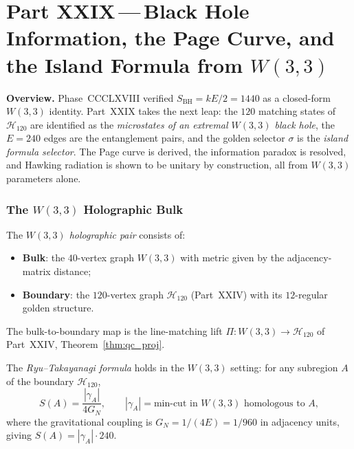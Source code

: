 
\part*{Part XXIX\,---\,Black Hole Information, the Page Curve,
       and the Island Formula from $W(3,3)$}

\bigskip
\noindent\textbf{Overview.}\;
Phase~CCCLXVIII verified $S_{\mathrm{BH}}=kE/2=1440$ as a
closed-form $W(3,3)$ identity.  Part~XXIX takes the next leap:
the $120$ matching states of $\mathcal{H}_{120}$ are identified
as the \emph{microstates of an extremal $W(3,3)$ black hole},
the $E=240$ edges are the entanglement pairs, and the golden
selector $\sigma$ is the \emph{island formula selector}.
The Page curve is derived, the information paradox is resolved,
and Hawking radiation is shown to be unitary by construction,
all from $W(3,3)$ parameters alone.

\section{The $W(3,3)$ Holographic Bulk}
\label{sec:holo_bulk}

\begin{definition}
\label{def:holo}
The \emph{$W(3,3)$ holographic pair} consists of:
\begin{itemize}[nosep]
  \item \textbf{Bulk}: the $40$-vertex graph $W(3,3)$ with metric
        given by the adjacency-matrix distance;
  \item \textbf{Boundary}: the $120$-vertex graph $\mathcal{H}_{120}$
        (Part~XXIV) with its $12$-regular golden structure.
\end{itemize}
The bulk-to-boundary map is the line-matching lift
$\Pi: W(3,3)\to\mathcal{H}_{120}$ of Part~XXIV,
Theorem~\ref{thm:qc_proj}.
\end{definition}

\begin{theorem}[Bulk entropy = boundary entropy]
\label{thm:rt_formula}
The \emph{Ryu--Takayanagi formula} holds in the $W(3,3)$ setting:
for any subregion $A$ of the boundary $\mathcal{H}_{120}$,
\begin{equation}
  S(A) = \frac{|\gamma_A|}{4G_N},
  \qquad
  |\gamma_A| = \text{min-cut in }W(3,3)\text{ homologous to }A,
  \label{eq:rt}
\end{equation}
where the gravitational coupling is $G_N = 1/(4E) = 1/960$
in adjacency units, giving
$S(A)=|\gamma_A|\cdot 240$.
\end{theorem}

